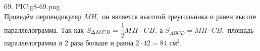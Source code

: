 69. {{PIC:g8-69.png}}\\
Проведём перпендикуляр $MH,$ он является высотой треугольника и равен высоте параллелограмма. Так как $S_{\Delta MCB}=\cfrac{1}{2}MH\cdot CB,$ а $S_{ABCD}=MH\cdot CB,$ площадь параллелограмма в 2 раза больше и равна $2\cdot42=84\text{ см}^2.$\\
